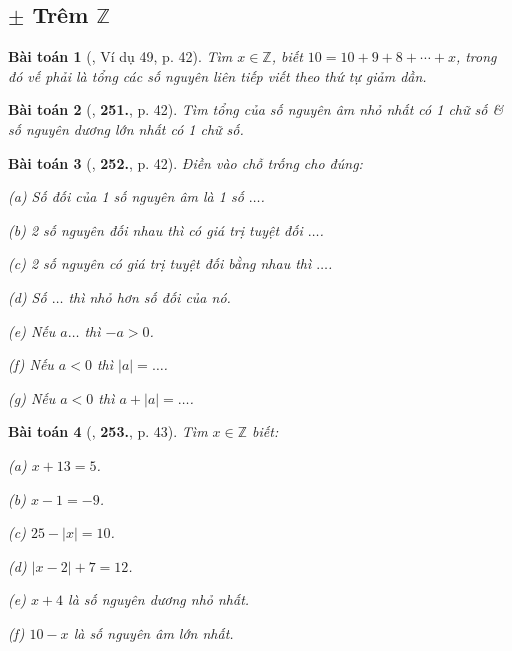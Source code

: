 \documentclass{article}
\numberwithin{equation}{section}
\newtheorem{baitoan}{Bài toán}
\begin{document}
\subsection{$\pm$ Trêm $\mathbb{Z}$}

\begin{baitoan}[\cite{Binh_Toan_6_tap_1}, Ví dụ 49, p. 42]
	Tìm $x\in\mathbb{Z}$, biết $10 = 10 + 9 + 8 + \cdots + x$, trong đó vế phải là tổng các số nguyên liên tiếp viết theo thứ tự giảm dần.
\end{baitoan}

\begin{baitoan}[\cite{Binh_Toan_6_tap_1}, \textbf{251.}, p. 42]
	Tìm tổng của số nguyên âm nhỏ nhất có 1 chữ số \& số nguyên dương lớn nhất có 1 chữ số.
\end{baitoan}

\begin{baitoan}[\cite{Binh_Toan_6_tap_1}, \textbf{252.}, p. 42]
	Điền vào chỗ trống cho đúng:
	\begin{enumerate*}
		\item[(a)] Số đối của 1 số nguyên âm là 1 số $\ldots$.
		\item[(b)] 2 số nguyên đối nhau thì có giá trị tuyệt đối $\ldots$.
		\item[(c)] 2 số nguyên có giá trị tuyệt đối bằng nhau thì $\ldots$.
		\item[(d)] Số $\ldots$ thì nhỏ hơn số đối của nó.
		\item[(e)] Nếu $a\ldots$ thì $-a > 0$.
		\item[(f)] Nếu $a < 0$ thì $|a| = \ldots$.
		\item[(g)] Nếu $a < 0$ thì $a + |a| = \ldots$.
	\end{enumerate*}
\end{baitoan}

\begin{baitoan}[\cite{Binh_Toan_6_tap_1}, \textbf{253.}, p. 43]
	Tìm $x\in\mathbb{Z}$ biết:
	\begin{enumerate*}
		\item[(a)] $x + 13 = 5$.
		\item[(b)] $x - 1 = -9$.
		\item[(c)] $25 - |x| = 10$.
		\item[(d)] $|x - 2| + 7 = 12$.
		\item[(e)] $x + 4$ là số nguyên dương nhỏ nhất.
		\item[(f)] $10 - x$ là số nguyên âm lớn nhất.
	\end{enumerate*}
\end{baitoan}
\end{document}
